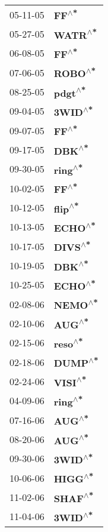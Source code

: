 \begin{supertabular}{p{0.08\textwidth}p{0.2\textwidth}}
 05-11-05 &     \textbf{FF\textsuperscript{$\wedge$*}} \\
 05-27-05 &   \textbf{WATR\textsuperscript{$\wedge$*}} \\
 06-08-05 &     \textbf{FF\textsuperscript{$\wedge$*}} \\
 07-06-05 &   \textbf{ROBO\textsuperscript{$\wedge$*}} \\
 08-25-05 &   \textbf{pdgt\textsuperscript{$\wedge$*}} \\
 09-04-05 &   \textbf{3WID\textsuperscript{$\wedge$*}} \\
 09-07-05 &     \textbf{FF\textsuperscript{$\wedge$*}} \\
 09-17-05 &    \textbf{DBK\textsuperscript{$\wedge$*}} \\
 09-30-05 &   \textbf{ring\textsuperscript{$\wedge$*}} \\
 10-02-05 &     \textbf{FF\textsuperscript{$\wedge$*}} \\
 10-12-05 &   \textbf{flip\textsuperscript{$\wedge$*}} \\
 10-13-05 &   \textbf{ECHO\textsuperscript{$\wedge$*}} \\
 10-17-05 &   \textbf{DIVS\textsuperscript{$\wedge$*}} \\
 10-19-05 &    \textbf{DBK\textsuperscript{$\wedge$*}} \\
 10-25-05 &   \textbf{ECHO\textsuperscript{$\wedge$*}} \\
 02-08-06 &   \textbf{NEMO\textsuperscript{$\wedge$*}} \\
 02-10-06 &    \textbf{AUG\textsuperscript{$\wedge$*}} \\
 02-15-06 &   \textbf{reso\textsuperscript{$\wedge$*}} \\
 02-18-06 &   \textbf{DUMP\textsuperscript{$\wedge$*}} \\
 02-24-06 &   \textbf{VISI\textsuperscript{$\wedge$*}} \\
 04-09-06 &   \textbf{ring\textsuperscript{$\wedge$*}} \\
 07-16-06 &    \textbf{AUG\textsuperscript{$\wedge$*}} \\
 08-20-06 &    \textbf{AUG\textsuperscript{$\wedge$*}} \\
 09-30-06 &   \textbf{3WID\textsuperscript{$\wedge$*}} \\
 10-06-06 &   \textbf{HIGG\textsuperscript{$\wedge$*}} \\
 11-02-06 &   \textbf{SHAF\textsuperscript{$\wedge$*}} \\
 11-04-06 &   \textbf{3WID\textsuperscript{$\wedge$*}} \\

\end{supertabular}
